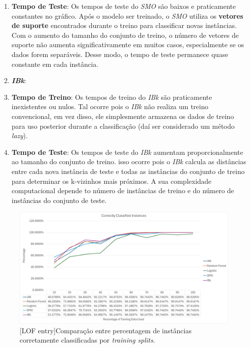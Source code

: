 \documentclass{easychair}
\begin{document}
\begin{enumerate}
		\item[\textbullet] \textbf{Tempo de Teste}: Os tempos de teste do \textit{SMO} são baixos e praticamente constantes no gráfico. Após o modelo ser treinado, o \textit{SMO} utiliza os \textbf{vetores de suporte} encontrados durante o treino para classificar novas instâncias. Com o aumento do tamanho do conjunto de treino, o número de vetores de suporte não aumenta significativamente em muitos casos, especialmente se os dados forem separáveis. Desse modo, o tempo de teste permanece quase constante em cada instância.
	\item \textbf{\textit{IBk}}: 
		\item[\textbullet] \textbf{Tempo de Treino}: Os tempos de treino do \textit{IBk} são praticamente inexistentes ou nulos. Tal ocorre pois o \textit{IBk} não realiza um treino convencional, em vez disso, ele simplesmente armazena os dados de treino para uso posterior durante a classificação (daí ser considerado um método \textit{lazy}). 
		\item[\textbullet] \textbf{Tempo de Teste}: Os tempos de teste do \textit{IBk} aumentam proporcionalmente ao tamanho do conjunto de treino. isso ocorre pois o \textit{IBk} calcula as distâncias entre cada nova instância de teste e todas as instâncias do conjunto de treino para determinar os k-vizinhos mais próximos. A sua complexidade computacional depende to número de instâncias de treino e do número de instâncias do conjunto de teste. 
\end{enumerate}


\begin{figure}[H]
    \begin{centering}
    \includegraphics[width=1\linewidth]{imagens/figure32.jpg}\label{cap-5-fig32}
    [LOF entry]{Comparação entre percentagem de instâncias corretamente classificadas por \textit{training splits}.}
    \label{fig32}
    \end{centering}
\end{figure}
\end{document}
